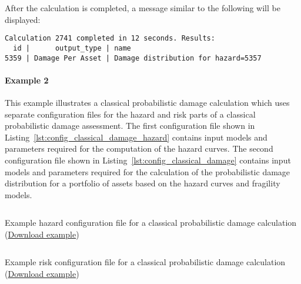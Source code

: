 After the calculation is completed, a message similar to the following will be
displayed:

\begin{verbatim}
Calculation 2741 completed in 12 seconds. Results:
  id |      output_type | name
5359 | Damage Per Asset | Damage distribution for hazard=5357
\end{verbatim}


\paragraph{Example 2}

This example illustrates a classical probabilistic damage calculation which
uses separate configuration files for the hazard and risk parts of a classical
probabilistic damage assessment. The first configuration file shown in
Listing~\ref{lst:config_classical_damage_hazard} contains input models and parameters
required for the computation of the hazard curves. The second configuration
file shown in Listing~\ref{lst:config_classical_damage} contains input models
and parameters required for the calculation of the probabilistic damage
distribution for a portfolio of assets based on the hazard curves and
fragility models.

\begin{listing}[htbp]
  \inputminted[firstline=1,firstnumber=1,fontsize=\footnotesize,frame=single,linenos,bgcolor=lightgray,label=job\_hazard.ini]{ini}{oqum/risk/verbatim/config_classical_hazard.ini}
  \caption{Example hazard configuration file for a classical probabilistic damage calculation (\href{https://raw.githubusercontent.com/GEMScienceTools/oq-engine-docs/master/oqum/risk/verbatim/config_classical_hazard.xml}{Download example})}
  \label{lst:config_classical_damage_hazard}
\end{listing}

\begin{listing}[htbp]
  \inputminted[firstline=1,firstnumber=1,fontsize=\footnotesize,frame=single,linenos,bgcolor=lightgray,label=job\_damage.ini]{ini}{oqum/risk/verbatim/config_classical_damage.ini}
  \caption{Example risk configuration file for a classical probabilistic damage calculation (\href{https://raw.githubusercontent.com/GEMScienceTools/oq-engine-docs/master/oqum/risk/verbatim/config_classical_damage.xml}{Download example})}
  \label{lst:config_classical_damage}
\end{listing}

